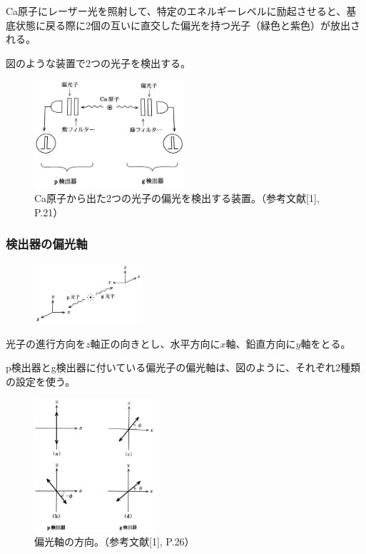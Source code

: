 \documentclass[10pt,b5paper,papersize,dvipdfmx]{jsbook}
\begin{document}
Ca原子にレーザー光を照射して、特定のエネルギーレベルに励起させると、基底状態に戻る際に2個の互いに直交した偏光を持つ光子（緑色と紫色）が放出される。

図のような装置で2つの光子を検出する。

\begin{figure}[ht]
  \centering
  \includegraphics[height=40mm]{nkym/fig/souchi.jpeg}
  \caption{Ca原子から出た2つの光子の偏光を検出する装置。（参考文献[1], P.21）}
\end{figure}

%
\subsubsection{検出器の偏光軸}

\begin{figure}[ht]
  \centering
  \includegraphics[width=40mm]{nkym/fig/zahyou-kei.jpeg}
\end{figure}

光子の進行方向を$z$軸正の向きとし、水平方向に$x$軸、鉛直方向に$y$軸をとる。

p検出器とg検出器に付いている偏光子の偏光軸は、図のように、それぞれ2種類の設定を使う。

\begin{figure}[ht]
  \centering
  \includegraphics[width=45mm]{nkym/fig/henkou-jiku.jpeg}
  \caption{偏光軸の方向。（参考文献[1], P.26）}
\end{figure}
\end{document}
